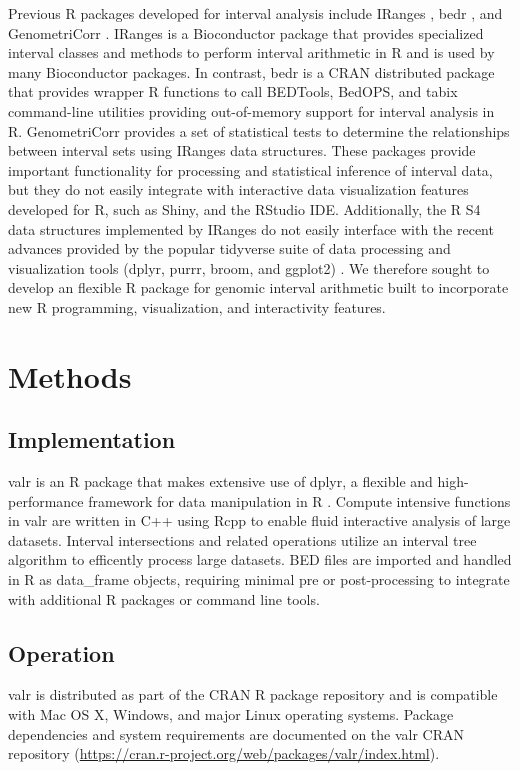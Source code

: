 \documentclass[9pt,a4paper]{extarticle}
\begin{document}
Previous R packages developed for interval analysis include IRanges \cite{lawrence_software_2013}, bedr \cite{haider_bedr_2016}, and GenometriCorr \cite{favorov_exploring_2012}. IRanges is a Bioconductor package that provides specialized interval classes and methods to perform interval arithmetic in R and is used by many Bioconductor packages. In contrast, bedr is a CRAN distributed package that provides wrapper R functions to call BEDTools, BedOPS, and tabix command-line utilities providing out-of-memory support for interval analysis in R. GenometriCorr provides a set of statistical tests to determine the relationships between interval sets using IRanges data structures. These packages provide important functionality for processing and statistical inference of interval data, but they do not easily integrate with interactive data visualization features developed for R, such as Shiny\cite{chang_shiny_2017}, and the RStudio IDE. Additionally, the R S4 data structures implemented by IRanges do not easily interface with the recent advances provided by the popular tidyverse suite of data processing and visualization tools (dplyr, purrr, broom, and ggplot2) \cite{wickham_tidyverse_2017}. We therefore sought to develop an flexible R package for genomic interval arithmetic built to incorporate new R programming, visualization, and interactivity features.

\section*{Methods}

\subsection*{Implementation}
valr is an R package that makes extensive use of dplyr, a flexible and high-performance framework for data manipulation in R \cite{wickham_dplyr_2016}. Compute intensive functions in valr are written in C++ using Rcpp to enable fluid interactive analysis of large datasets\cite{eddelbuettel_rcpp_2011}. Interval intersections and related operations utilize an interval tree algorithm to efficently process large datasets\cite{cormen_2001}. BED files are imported and handled in R as data\_frame objects, requiring minimal pre or post-processing to integrate with additional R packages or command line tools.

\subsection*{Operation}
valr is distributed as part of the CRAN R package repository and is compatible with Mac OS X, Windows, and major Linux operating systems. Package dependencies and system requirements are documented on the valr CRAN repository (\url{https://cran.r-project.org/web/packages/valr/index.html}).
\end{document}

